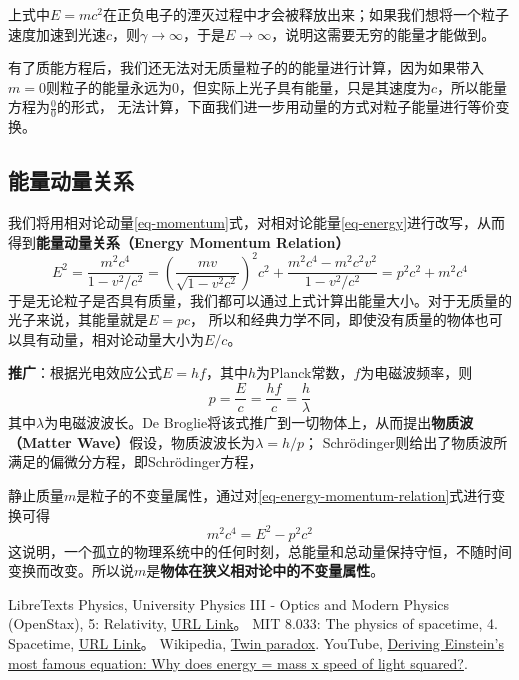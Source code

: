 \documentclass[12pt, a4paper, oneside]{ctexart}
\numberwithin{equation}{section}  %
\def\add{\vspace{1ex}}      %
\begin{document}
上式中$E = mc^2$在正负电子的湮灭过程中才会被释放出来；如果我们想将一个粒子速度加速到光速$c$，则$\gamma\to \infty$，于是$E\to\infty$，说明这需要无穷的能量才能做到。

有了质能方程后，我们还无法对无质量粒子的的能量进行计算，\add 因为如果带入$m=0$则粒子的能量永远为$0$，\add 但实际上光子具有能量，只是其速度为$c$，所以能量方程为$\frac{0}{0}$的形式，
无法计算，下面我们进一步用动量的方式对粒子能量进行等价变换。

\subsection{能量动量关系}
我们将用相对论动量\ref{eq-momentum}式，对相对论能量\ref{eq-energy}进行改写，从而得到\textbf{能量动量关系（Energy Momentum Relation）}
\begin{equation}\label{eq-energy-momentum-relation}
    E^2 = \frac{m^2c^4}{1-v^2/c^2} = \left(\frac{mv}{\sqrt{1-v^2c^2}}\right)^2c^2 + \frac{m^2c^4-m^2c^2v^2}{1-v^2/c^2} = p^2c^2 + m^2c^4
\end{equation}
于是无论粒子是否具有质量，我们都可以通过上式计算出能量大小。对于无质量的光子来说，其能量就是$E = pc$，
所以和经典力学不同，即使没有质量的物体也可以具有动量，相对论动量大小为$E/c$。

\textbf{推广}：根据光电效应公式$E = hf$，其中$h$为Planck常数，$f$为电磁波频率，则
\begin{equation}
    p = \frac{E}{c} = \frac{hf}{c} = \frac{h}{\lambda}
\end{equation}
其中$\lambda$为电磁波波长。De Broglie将该式推广到一切物体上，从而提出\textbf{物质波（Matter Wave）}假设，物质波波长为$\lambda = h/p$；
Schrödinger则给出了物质波所满足的偏微分方程，即Schrödinger方程，

静止质量$m$是粒子的不变量属性，通过对\ref{eq-energy-momentum-relation}式进行变换可得
\begin{equation}
    m^2c^4 = E^2 - p^2c^2
\end{equation}
这说明，一个孤立的物理系统中的任何时刻，总能量和总动量保持守恒，不随时间变换而改变。所以说$m$是\textbf{物体在狭义相对论中的不变量属性}。
\begin{thebibliography}{99}
    LibreTexts Physics, University Physics III - Optics and Modern Physics (OpenStax), 5: Relativity, \href{https://phys.libretexts.org/Bookshelves/University\_Physics/Book\%3A\_University\_Physics\_(OpenStax)/University\_Physics\_III\_-\_Optics\_and\_Modern\_Physics\_(OpenStax)/05\%3A\_\_Relativity}{URL Link}。
    MIT 8.033: The physics of spacetime, 4. Spacetime, \href{https://web.mit.edu/sahughes/www/8.033/lec04.pdf}{URL Link}。
    Wikipedia, \href{https://en.wikipedia.org/wiki/Twin_paradox}{Twin paradox}.
    YouTube, \href{https://www.youtube.com/watch?v=KZ8G4VKoSpQ}{Deriving Einstein's most famous equation: Why does energy = mass x speed of light squared?}.
\end{thebibliography}
\end{document}
